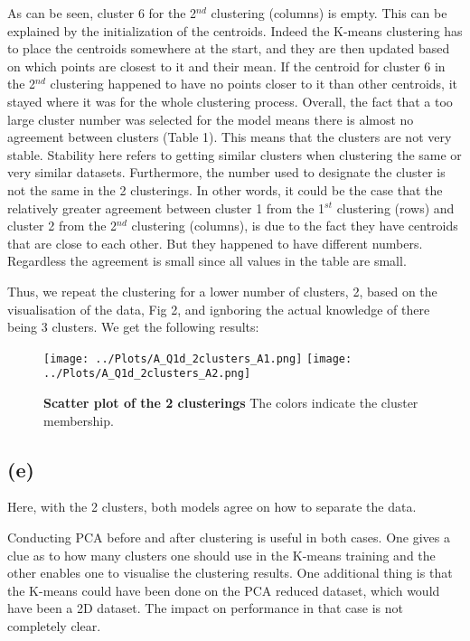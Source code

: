 \documentclass[12pt]{report} %
\begin{document}
As can be seen, cluster 6 for the 2$^{nd}$ clustering (columns) is empty. This can be explained by the initialization of the centroids. Indeed the K-means clustering has to place the centroids somewhere at the start, and they are then updated based on which points are closest to it and their mean. If the centroid for cluster 6 in the 2$^{nd}$ clustering happened to have no points closer to it than other centroids, it stayed where it was for the whole clustering process\cite{scikit-learn}. Overall, the fact that a too large cluster number was selected for the model means there is almost no agreement between clusters (Table 1).  This means that the clusters are not very stable. Stability here refers to getting similar clusters when clustering the same or very similar datasets. Furthermore, the number used to designate the cluster is not the same in the 2 clusterings. In other words, it could be the case that the relatively greater agreement between cluster 1 from the 1$^{st}$ clustering (rows) and cluster 2 from the 2$^{nd}$ clustering (columns), is due to the fact they have centroids that are close to each other. But they happened to have different numbers. Regardless the agreement is small since all values in the table are small.  

Thus, we repeat the clustering for a lower number of clusters, 2, based on the visualisation of the data, Fig 2, and ignboring the actual knowledge of there being 3 clusters. We get the following results:


\begin{figure}[h]
    \centering
    \texttt{[image: ../Plots/A\_Q1d\_2clusters\_A1.png]}
    \texttt{[image: ../Plots/A\_Q1d\_2clusters\_A2.png]}
    \caption{\textbf{Scatter plot of the 2 clusterings} The colors indicate the cluster membership.}
\end{figure}

\subsection*{(e)}

Here, with the 2 clusters, both models agree on how to separate the data. 

Conducting PCA before and after clustering is useful in both cases. One gives a clue as to how many clusters one should use in the K-means training and the other enables one to visualise the clustering results. One additional thing is that the K-means could have been done on the PCA reduced dataset, which would have been a 2D dataset. The impact on performance in that case is not completely clear.
\end{document}

